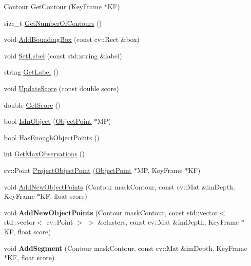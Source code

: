\begin{DoxyCompactItemize}
\item 
Contour \hyperlink{classObject_a8295fd33f9ebe850dbfef7b1f70f326d}{Get\+Contour} (Key\+Frame $\ast$KF)
\item 
size\+\_\+t \hyperlink{classObject_a211d9a8ea1cfbc9a3bc766b76e5d41be}{Get\+Number\+Of\+Contours} ()
\item 
void \hyperlink{classObject_a93f6229c59ae6f435b0a31ee285740ae}{Add\+Bounding\+Box} (const cv\+::\+Rect \&box)
\item 
void \hyperlink{classObject_ad680f6b7841320d67f6caf8813dc7aeb}{Set\+Label} (const std\+::string \&label)
\item 
string \hyperlink{classObject_ab60f1df2e7bd47cdfb77a529d5ad6c69}{Get\+Label} ()
\item 
void \hyperlink{classObject_a92f56ff635e752ffa2674596c8f7c1ae}{Update\+Score} (const double score)
\item 
double \hyperlink{classObject_a440178c130d1b50d232d9b96510e45a6}{Get\+Score} ()
\item 
bool \hyperlink{classObject_a38c47e88eb887dc62031e1c817e5fead}{Is\+In\+Object} (\hyperlink{classObjectPoint}{Object\+Point} $\ast$MP)
\item 
bool \hyperlink{classObject_ad4cb82b18bd457d631cb79cec0db98ac}{Has\+Enough\+Object\+Points} ()
\item 
int \hyperlink{classObject_a9fbecce492d60540c9d3fa2f81773552}{Get\+Max\+Observations} ()
\item 
cv\+::\+Point \hyperlink{classObject_a38bd011f1b615252420ae2e89d786205}{Project\+Object\+Point} (\hyperlink{classObjectPoint}{Object\+Point} $\ast$MP, Key\+Frame $\ast$KF)
\item 
void \hyperlink{classObject_a419bf8497ede00f30dd9ebacaac18987}{Add\+New\+Object\+Points} (Contour mask\+Contour, const cv\+::\+Mat \&im\+Depth, Key\+Frame $\ast$KF, float score)
\item 
\mbox{\label{classObject_a221ae11d61c3ef7a7f80bde2f8d9290a}} 
void {\bfseries Add\+New\+Object\+Points} (Contour mask\+Contour, const std\+::vector$<$ std\+::vector$<$ cv\+::\+Point $>$ $>$ \&clusters, const cv\+::\+Mat \&im\+Depth, Key\+Frame $\ast$KF, float score)
\item 
\mbox{\label{classObject_a531db2d7eb149102750890f7aab97de2}} 
void {\bfseries Add\+Segment} (Contour mask\+Contour, const cv\+::\+Mat \&im\+Depth, Key\+Frame $\ast$KF, float score)
\item 

\end{DoxyCompactItemize}
